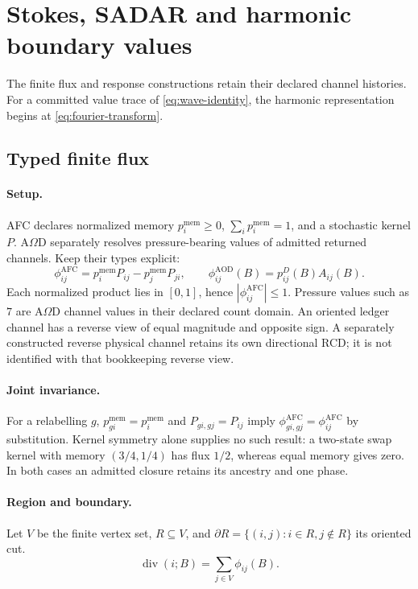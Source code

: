 
\section{Stokes, SADAR and harmonic boundary values}
\label{sec:stokes-sadar-harmonic}
\label{sec:afc-stokes-seed}
\label{subsec:afc-stokes-identity}
The finite flux and response constructions retain their declared channel histories.
For a committed value trace of \eqref{eq:wave-identity}, the harmonic
representation begins at \eqref{eq:fourier-transform}.
\subsection{Typed finite flux}
\paragraph{Setup.}
AFC declares normalized memory \(p_i^{\mathrm{mem}}\ge0\), \(\sum_i p_i^{\mathrm{mem}}=1\),
and a stochastic kernel \(P\). A\(\Omega\)D separately resolves pressure-bearing
values of admitted returned channels. Keep their types explicit:
\begin{equation}
\phi^{\mathrm{AFC}}_{ij}=p_i^{\mathrm{mem}}P_{ij}-p_j^{\mathrm{mem}}P_{ji},
\qquad \phi^{\mathrm{AOD}}_{ij}(B)=p^D_{ij}(B)A_{ij}(B).
\label{eq:flux-types}
\end{equation}
Each normalized product lies in \([0,1]\), hence
\(|\phi^{\mathrm{AFC}}_{ij}|\le1\). Pressure values such as \(7\) are A\(\Omega\)D
channel values in their declared count domain. An oriented ledger channel
has a reverse view of equal magnitude and opposite sign. A separately
constructed reverse physical channel retains its own directional RCD; it
is not identified with that bookkeeping reverse view.

\paragraph{Joint invariance.}
For a relabelling \(g\), \(p^{\mathrm{mem}}_{gi}=p^{\mathrm{mem}}_i\) and
\(P_{gi,gj}=P_{ij}\) imply \(\phi^{\mathrm{AFC}}_{gi,gj}=\phi^{\mathrm{AFC}}_{ij}\)
by substitution. Kernel symmetry alone supplies no such result: a two-state
swap kernel with memory \((3/4,1/4)\) has flux \(1/2\), whereas equal memory
gives zero. In both cases an admitted closure retains its ancestry and one phase.

\paragraph{Region and boundary.}
Let \(V\) be the finite vertex set, \(R\subseteq V\), and
\(\partial R=\{(i,j):i\in R,j\notin R\}\) its oriented cut.
\begin{equation}
\operatorname{div}(i;B)=\sum_{j\in V}\phi_{ij}(B).
\label{eq:b-scoped-divergence}
\end{equation}
